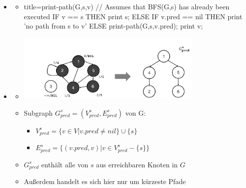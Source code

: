 \documentclass[
    12pt,
    a4paper,
    ngerman,
    color=3b,%
    marginpar=false,
    colorback=false,
    leqno,
]{tudaexercise}
\begin{document}
\begin{itemize}
\pagebreak

        \item {}
            \begin{itemize}
                \item[]
                    \begin{ccode}[autogobble]{title={print-path(G,s,v) // Assumes that BFS(G,s) has already been executed}}
                    IF v == s THEN
                        print s;
                    ELSE
                        IF v.pred == nil THEN
                            print 'no path from s to v'
                        ELSE
                            print-path(G,s,v.pred);
                            print v;
                    \end{ccode}
            \end{itemize}

        \item {}
            \begin{itemize}
                \item[] \includegraphics[width=9cm]{pictures/bfsBaum.PNG}
                \item Subgraph $G^s_{pred} = (V^s_{pred},E^s_{pred})$ von G:
                    \begin{itemize}
                        \item $V^s_{pred} = \{v \in V | v.pred \neq nil\} \cup \{s\}$
                        \item $E^s_{pred} = \{(v.pred,v) | v \in V^s_{pred} - \{s\}\}$
                    \end{itemize}
                \item $G^s_{pred}$ enthält alle von $s$ aus erreichbaren Knoten in $G$
                \item Außerdem handelt es sich hier nur um kürzeste Pfade
            \end{itemize}
    \end{itemize}
\end{document}
